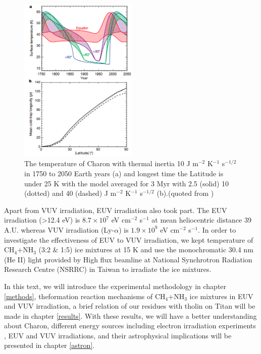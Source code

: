 \begin{figure}
\centering
\includegraphics[width=0.5\textwidth]{figures/chapter1/thermal.png}
\caption{The temperature of Charon with thermal inertia 10 J m$^{-2}$ K$^{-1}$ s$^{-1/2}$ in 1750 to 2050 Earth years (a) and longest time the Latitude is under 25 K with the model averaged for 3 Myr with 2.5 (solid) 10 (dotted) and 40 (dashed) J m$^{-2}$ K$^{-1}$ s$^{-1/2}$ (b).(quoted from \cite{grundy2016formation})}
\label{fig:Charon_thermal}
\end{figure}

Apart from VUV irradiation, EUV irradiation also took part. The EUV irradiation (>12.4 eV) is $8.7 \times 10^7$ eV cm$^{-2}$ s$^{-1}$ at mean heliocentric distance 39 A.U. whereas VUV irradiation (Ly-$\alpha$) is $1.9 \times 10^9$ eV cm$^{-2}$ s$^{-1}$\cite{grundy2016formation}. In order to investigate the effectiveness of EUV to VUV irradiation, we kept temperature of CH$_4$+NH$_3$ (3:2 \& 1:5) ice mixtures at 15 K and use the monochromatic 30.4 nm (He II) light provided by High flux beamline at National Synchrotron Radiation Research Centre (NSRRC) in Taiwan to irradiate the ice mixtures.

In this text, we will introduce the experimental methodology in chapter \ref{methods}, theformation reaction mechanisms of CH$_4$+NH$_3$ ice mixtures in EUV and VUV irradiation, a brief relation of our residues with tholin on Titan will be made in chapter \ref{results}. With these results, we will have a better understanding about Charon, different energy sources including electron irradiation experiments , EUV and VUV irradiations, and their astrophysical implications will be presented in chapter \ref{astron}.
